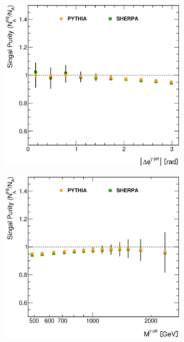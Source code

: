 \documentclass[12pt, twoside]{article}
\numberwithin{equation}{section}
\numberwithin{figure}{section}
\newenvironment{changemargin}[2]{%
\begin{list}{}{%
\setlength{\topsep}{0pt}%
\setlength{\leftmargin}{#1}%
\setlength{\rightmargin}{#2}%
\setlength{\listparindent}{\parindent}%
\setlength{\itemindent}{\parindent}%
\setlength{\parsep}{\parskip}%
}%
\item[]}{\end{list}}
\begin{document}
\begin{figure}
\begin{changemargin}{-1.0cm}{-0.75cm}
\begin{changemargin}{-0.75cm}{-1.0cm}
        \vspace{0.2cm}
        \begin{subfigure}[b]{0.37\textwidth}
            \includegraphics[width=\textwidth]{./images/SignalPurity/SIG_PUR-107.eps}
            \subcaption{}
            \label{fig:PurityDeltaPhiPhotonJet}
        \end{subfigure}
        \begin{subfigure}[b]{0.37\textwidth}
            \includegraphics[width=\textwidth]{./images/SignalPurity/SIG_PUR-108.eps}

\end{subfigure}
\end{changemargin}
\end{changemargin}
\end{figure}
\end{document}
